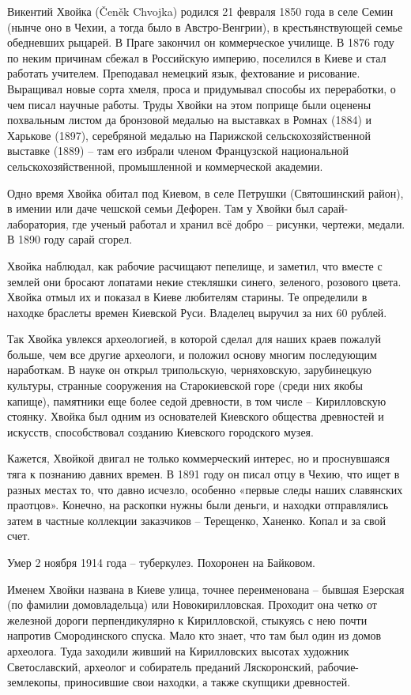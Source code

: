 Викентий Хвойка (Čeněk Chvojka) родился 21 февраля 1850 года в селе Семин (нынче оно в Чехии, а тогда было в Австро-Венгрии), в крестьянствующей семье обедневших рыцарей. В Праге закончил он коммерческое училище. В 1876 году по неким причинам сбежал в Российскую империю, поселился в Киеве и стал работать учителем. Преподавал немецкий язык, фехтование и рисование. Выращивал новые сорта хмеля, проса и придумывал способы их переработки, о чем писал научные работы. Труды Хвойки на этом поприще были оценены похвальным листом да бронзовой медалью на выставках в Ромнах (1884) и Харькове (1897), серебряной медалью на Парижской сельскохозяйственной выставке (1889) – там его избрали членом Французской национальной сельскохозяйственной, промышленной и коммерческой академии.

Одно время Хвойка обитал под Киевом, в селе Петрушки (Святошинский район), в имении или даче чешской семьи Дефорен. Там у Хвойки был сарай-лаборатория, где ученый работал и хранил всё добро – рисунки, чертежи, медали. В 1890 году сарай сгорел.

Хвойка наблюдал, как рабочие расчищают пепелище, и заметил, что вместе с землей они бросают лопатами некие стекляшки синего, зеленого, розового цвета. Хвойка отмыл их и показал в Киеве любителям старины. Те определили в находке браслеты времен Киевской Руси. Владелец выручил за них 60 рублей.

Так Хвойка увлекся археологией, в которой сделал для наших краев пожалуй больше, чем все другие археологи, и положил основу многим последующим наработкам. В науке он открыл трипольскую, черняховскую, зарубинецкую культуры, странные сооружения на Старокиевской горе (среди них якобы капище), памятники еще более седой древности, в том числе – Кирилловскую стоянку. Хвойка был одним из основателей Киевского общества древностей и искусств, способствовал созданию Киевского городского музея.

Кажется, Хвойкой двигал не только коммерческий интерес, но и проснувшаяся тяга к познанию давних времен. В 1891 году он писал отцу в Чехию, что ищет в разных местах то, что давно исчезло, особенно «первые следы наших славянских праотцов». Конечно, на раскопки нужны были деньги, и находки отправлялись затем в частные коллекции заказчиков – Терещенко, Ханенко. Копал и за свой счет.

Умер 2 ноября 1914 года – туберкулез. Похоронен на Байковом.

Именем Хвойки названа в Киеве улица, точнее переименована – бывшая Езерская (по фамилии домовладельца) или Новокирилловская. Проходит она четко от железной дороги перпендикулярно к Кирилловской, стыкуясь с нею почти напротив Смородинского спуска. Мало кто знает, что там был один из домов археолога. Туда заходили живший на Кирилловских высотах художник Светославский, археолог и собиратель преданий Ляскоронский, рабочие-землекопы, приносившие свои находки, а также скупщики древностей.

